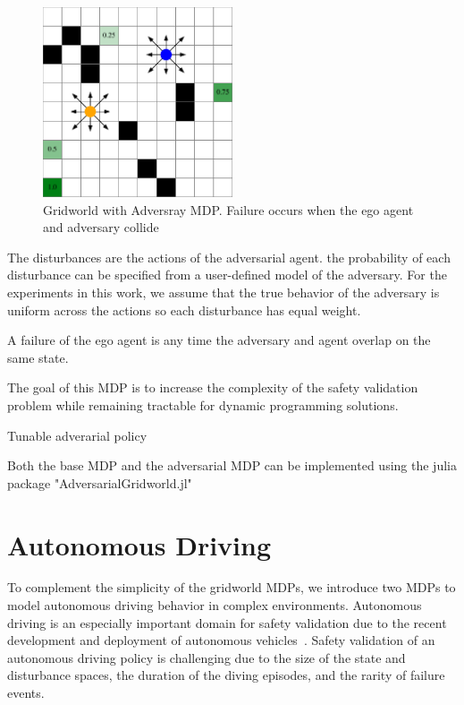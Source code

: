\begin{figure}
    \centering
    \includegraphics[width=0.5\textwidth]{figures/sample_systems/gridworld_with_adversary.pdf}
    \caption{Gridworld with Adversray MDP. Failure occurs when the ego agent and adversary collide}
    \label{fig:gridworld_with_adversary}
\end{figure}

The disturbances are the actions of the adversarial agent. the probability of each disturbance can be specified from a user-defined model of the adversary. For the experiments in this work, we assume that the true behavior of the adversary is uniform across the actions so each disturbance has equal weight. 

A failure of the ego agent is any time the adversary and agent overlap on the same state. 

The goal of this MDP is to increase the complexity of the safety validation problem while remaining tractable for dynamic programming solutions. 

Tunable adverarial policy

Both the base MDP and the adversarial MDP can be implemented using the julia package "AdversarialGridworld.jl"


\section{Autonomous Driving}
To complement the simplicity of the gridworld MDPs, we introduce two MDPs to model autonomous driving behavior in complex environments. Autonomous driving is an especially important domain for safety validation due to the recent development and deployment of autonomous vehicles~\cite{todo}. Safety validation of an autonomous driving policy is challenging due to the size of the state and disturbance spaces, the duration of the diving episodes, and the rarity of failure events.

